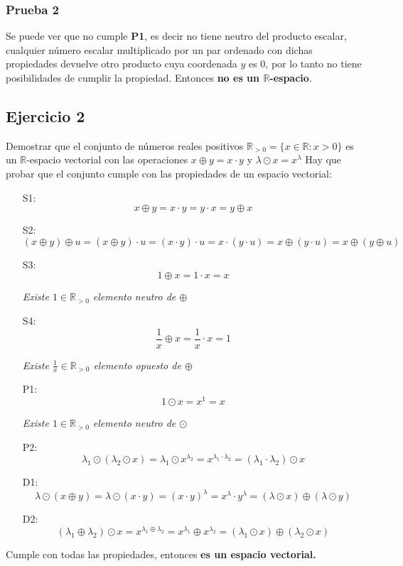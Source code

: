 \documentclass[a4paper,12pt]{article}
\begin{document}
\subsubsection{Prueba 2}
Se puede ver que no cumple \textbf{P1}, es decir no tiene neutro del producto escalar, cualquier número escalar multiplicado por un par ordenado con dichas propiedades devuelve otro producto cuya coordenada $y$ es 0, por lo tanto no tiene posibilidades de cumplir la propiedad. Entonces \textbf{no es un  $\mathds{R}$-espacio}.
\subsection{Ejercicio 2}
Demostrar que el conjunto de números reales positivos $\mathds{R}_{>0}=\{ x \in \mathds{R} : x>0 \} $ es un $\mathds{R}$-espacio vectorial con las operaciones $x\oplus y = x\cdot y $ y $\lambda \odot x = x^\lambda$
\newline Hay que probar que el conjunto cumple con las propiedades de un espacio vectorial:
\begin{itemize}
    \item[S1:] 
    $$
    x\oplus y = x\cdot y = y \cdot x = y \oplus x
    $$
    \item[S2:]
    $$
    (x \oplus y) \oplus u = (x \oplus y)\cdot u = (x\cdot y) \cdot u = x\cdot (y \cdot u) = x \oplus (y \cdot u) = x \oplus (y \oplus u)
    $$
    \item[S3:] 
    $$
    1 \oplus x = 1\cdot x = x
    $$
    \begin{center}
        \textit{Existe $1\in\mathds{R}_{>0}$ elemento neutro de $\oplus$}
    \end{center}
    \item[S4:]
    $$
    \frac{1}{x} \oplus x = \frac{1}{x} \cdot x = 1
    $$
    \begin{center}
        \textit{Existe $\frac{1}{x}\in\mathds{R}_{>0}$ elemento opuesto de $\oplus$}
    \end{center}
    \item[P1:]
    $$
    1 \odot x = x^1= x
    $$
    \begin{center}
        \textit{Existe $1\in\mathds{R}_{>0}$ elemento neutro de $\odot$}
    \end{center}
    \item[P2:]
    $$
    \lambda_1\odot(\lambda_2\odot x) = \lambda_1 \odot x^{\lambda_2}= x^{\lambda_1 \cdot \lambda_2}= (\lambda_1 \cdot \lambda_2) \odot x
    $$
    \item[D1:]
    $$
    \lambda \odot (x \oplus y) = \lambda \odot (x\cdot y) = (x\cdot y)^{\lambda} = x^{\lambda} \cdot y^{\lambda} = (\lambda \odot  x) \oplus (\lambda \odot y)
    $$
    \item[D2:]
    $$
    (\lambda_1 \oplus \lambda_2) \odot x = x^{\lambda_1 \oplus \lambda_2} = x^{\lambda_1}\oplus x^{\lambda_2} = (\lambda_1 \odot x) \oplus (\lambda_2 \odot x)
    $$
\end{itemize}
Cumple con todas las propiedades, entonces \textbf{es un espacio vectorial.}
\end{document}
